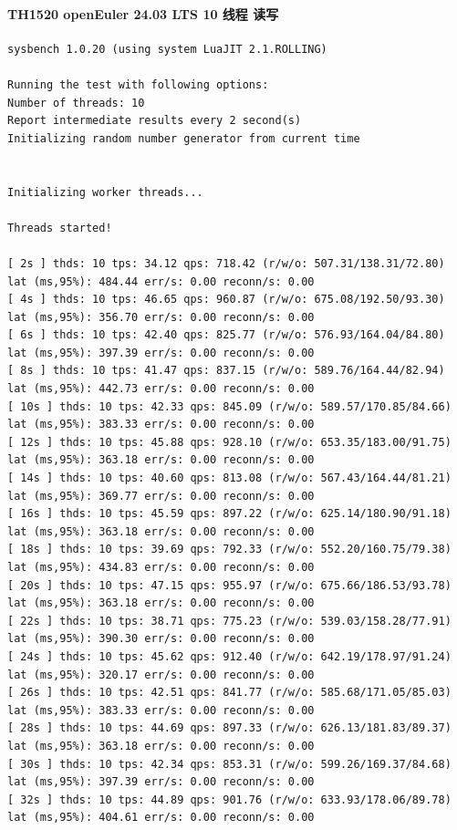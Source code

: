 \documentclass{article}
\begin{document}
\paragraph{TH1520 openEuler 24.03 LTS 10 线程 读写}

\begin{verbatim}
sysbench 1.0.20 (using system LuaJIT 2.1.ROLLING)

Running the test with following options:
Number of threads: 10
Report intermediate results every 2 second(s)
Initializing random number generator from current time


Initializing worker threads...

Threads started!

[ 2s ] thds: 10 tps: 34.12 qps: 718.42 (r/w/o: 507.31/138.31/72.80) lat (ms,95%): 484.44 err/s: 0.00 reconn/s: 0.00
[ 4s ] thds: 10 tps: 46.65 qps: 960.87 (r/w/o: 675.08/192.50/93.30) lat (ms,95%): 356.70 err/s: 0.00 reconn/s: 0.00
[ 6s ] thds: 10 tps: 42.40 qps: 825.77 (r/w/o: 576.93/164.04/84.80) lat (ms,95%): 397.39 err/s: 0.00 reconn/s: 0.00
[ 8s ] thds: 10 tps: 41.47 qps: 837.15 (r/w/o: 589.76/164.44/82.94) lat (ms,95%): 442.73 err/s: 0.00 reconn/s: 0.00
[ 10s ] thds: 10 tps: 42.33 qps: 845.09 (r/w/o: 589.57/170.85/84.66) lat (ms,95%): 383.33 err/s: 0.00 reconn/s: 0.00
[ 12s ] thds: 10 tps: 45.88 qps: 928.10 (r/w/o: 653.35/183.00/91.75) lat (ms,95%): 363.18 err/s: 0.00 reconn/s: 0.00
[ 14s ] thds: 10 tps: 40.60 qps: 813.08 (r/w/o: 567.43/164.44/81.21) lat (ms,95%): 369.77 err/s: 0.00 reconn/s: 0.00
[ 16s ] thds: 10 tps: 45.59 qps: 897.22 (r/w/o: 625.14/180.90/91.18) lat (ms,95%): 363.18 err/s: 0.00 reconn/s: 0.00
[ 18s ] thds: 10 tps: 39.69 qps: 792.33 (r/w/o: 552.20/160.75/79.38) lat (ms,95%): 434.83 err/s: 0.00 reconn/s: 0.00
[ 20s ] thds: 10 tps: 47.15 qps: 955.97 (r/w/o: 675.66/186.53/93.78) lat (ms,95%): 363.18 err/s: 0.00 reconn/s: 0.00
[ 22s ] thds: 10 tps: 38.71 qps: 775.23 (r/w/o: 539.03/158.28/77.91) lat (ms,95%): 390.30 err/s: 0.00 reconn/s: 0.00
[ 24s ] thds: 10 tps: 45.62 qps: 912.40 (r/w/o: 642.19/178.97/91.24) lat (ms,95%): 320.17 err/s: 0.00 reconn/s: 0.00
[ 26s ] thds: 10 tps: 42.51 qps: 841.77 (r/w/o: 585.68/171.05/85.03) lat (ms,95%): 383.33 err/s: 0.00 reconn/s: 0.00
[ 28s ] thds: 10 tps: 44.69 qps: 897.33 (r/w/o: 626.13/181.83/89.37) lat (ms,95%): 363.18 err/s: 0.00 reconn/s: 0.00
[ 30s ] thds: 10 tps: 42.34 qps: 853.31 (r/w/o: 599.26/169.37/84.68) lat (ms,95%): 397.39 err/s: 0.00 reconn/s: 0.00
[ 32s ] thds: 10 tps: 44.89 qps: 901.76 (r/w/o: 633.93/178.06/89.78) lat (ms,95%): 404.61 err/s: 0.00 reconn/s: 0.00

\end{verbatim}
\end{document}
